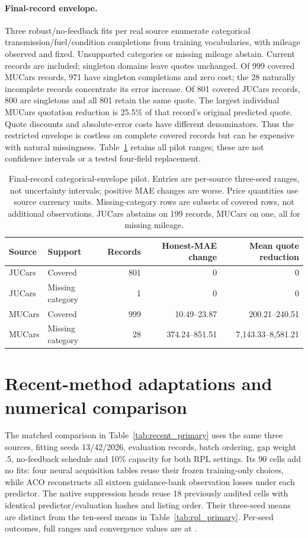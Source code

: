 \documentclass[11pt]{article}
\begin{document}
\paragraph{Final-record envelope.}
Three robust/no-feedback fits per real source enumerate categorical
transmission/fuel/condition completions from training vocabularies, with
mileage observed and fixed. Unsupported categories or missing mileage abstain.
Current records are included; singleton domains leave quotes unchanged.
Of 999 covered MUCars records, 971 have singleton completions and zero cost;
the 28 naturally incomplete records concentrate its error increase. Of 801
covered JUCars records, 800 are singletons and all 801 retain the same quote.
The largest individual MUCars quotation reduction is 25.5\% of that
record's original predicted quote. Quote discounts and absolute-error costs
have different denominators. Thus the restricted envelope is costless on
complete covered records but can be expensive with natural missingness. Table~\ref{tab:final_record_pilot} retains all pilot ranges;
these are not confidence intervals or a tested four-field replacement.

\begin{table}[htbp]\centering\small
\begin{tabular}{llrrr}\toprule
Source & Support & Records & Honest-MAE change & Mean quote reduction\\\midrule
JUCars & Covered & 801 & 0 & 0\\
JUCars & Missing category & 1 & 0 & 0\\
MUCars & Covered & 999 & 10.49--23.87 & 200.21--240.51\\
MUCars & Missing category & 28 & 374.24--851.51 & 7,143.33--8,581.21\\
\bottomrule\end{tabular}
\caption{Final-record categorical-envelope pilot. Entries are per-source
three-seed ranges, not uncertainty intervals; positive MAE changes are worse.
Price quantities use source currency units. Missing-category rows are subsets
of covered rows, not additional observations. JUCars abstains on 199 records,
MUCars on one, all for missing mileage.}\label{tab:final_record_pilot}
\end{table}
\section{Recent-method adaptations and numerical comparison}\label{app:completion_methods}
The matched comparison in Table~\ref{tab:recent_primary} uses the same
three sources, fitting seeds 13/42/2026, evaluation records, batch ordering,
gap weight .5, no-feedback schedule and 10\% capacity for both RPL settings.
Its 90 cells add no fits: four neural acquisition tables reuse their frozen
training-only choices, while ACO reconstructs all sixteen guidance-bank
observation losses under each predictor. The native suppression heads reuse
18 previously audited cells with identical predictor/evaluation hashes and
listing order. Their three-seed means are distinct from the ten-seed means
in Table~\ref{tab:rpl_primary}. Per-seed outcomes, full ranges and
convergence values are at .
\end{document}
